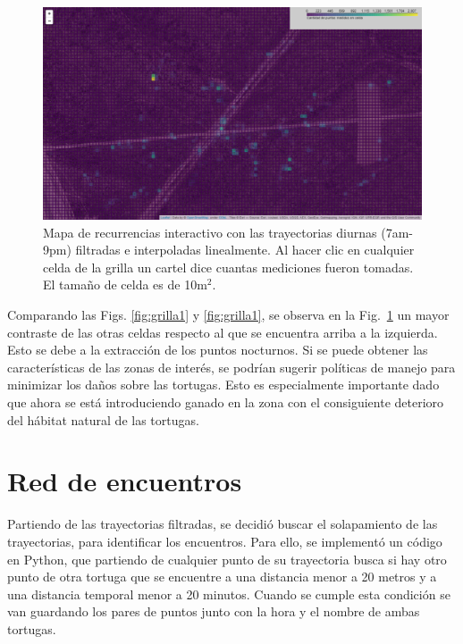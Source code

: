 \begin{figure}[ht]
    \begin{center}
       
   
    \includegraphics[width=\imsize]{Chap2/GrillaCintSNoche.png}
\end{center}
    \caption[Mapa con zona de recurrencia para trayectorias diurnas.]{Mapa de recurrencias  interactivo con las trayectorias diurnas (7am-9pm) filtradas e interpoladas linealmente. Al hacer clic en cualquier celda de la grilla un cartel dice cuantas mediciones fueron tomadas. El tamaño de celda es de 10m$^2$.}
    \label{fig:grillaInt}
\end{figure}
 
Comparando las Figs. \ref{fig:grilla1} y \ref{fig:grilla1}, se observa en la  Fig.~\ref{fig:grillaInt} un mayor contraste de las otras celdas respecto al que se encuentra arriba a la izquierda. Esto se debe a la extracción de los puntos nocturnos.  Si se puede obtener las características de las zonas de interés, se podrían sugerir políticas de manejo para minimizar los daños sobre las tortugas. Esto es especialmente importante dado que ahora se está introduciendo ganado en la zona con el consiguiente deterioro del hábitat natural de las tortugas.
 
\section{Red de encuentros}
Partiendo de las trayectorias filtradas, se decidió buscar el solapamiento de las trayectorias, para identificar los encuentros. Para ello, se implementó un código en Python, que partiendo de cualquier punto de su trayectoria busca si hay otro punto de otra tortuga que se encuentre a una distancia menor a 20 metros y a una distancia temporal menor a 20 minutos. Cuando se cumple esta condición se van guardando los pares de puntos junto con la hora y el nombre de ambas tortugas.
 

